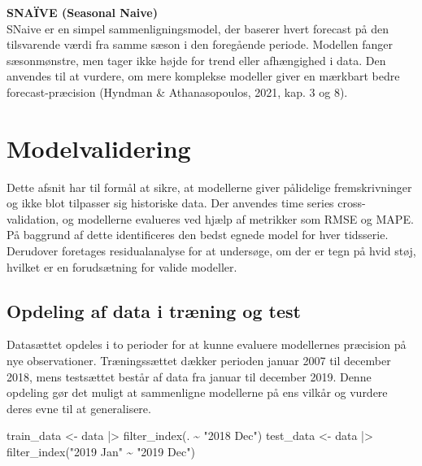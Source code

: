 \documentclass[
]{article}
\newenvironment{Shaded}{\begin{snugshade}}{\end{snugshade}}
\newcommand{\FunctionTok}[1]{\textcolor[rgb]{0.28,0.35,0.67}{#1}}
\newcommand{\NormalTok}[1]{\textcolor[rgb]{0.00,0.23,0.31}{#1}}
\newcommand{\OtherTok}[1]{\textcolor[rgb]{0.00,0.23,0.31}{#1}}
\newcommand{\SpecialCharTok}[1]{\textcolor[rgb]{0.37,0.37,0.37}{#1}}
\newcommand{\StringTok}[1]{\textcolor[rgb]{0.13,0.47,0.30}{#1}}
\begin{document}
\textbf{SNAÏVE (Seasonal Naive)}\\
SNaive er en simpel sammenligningsmodel, der baserer hvert forecast på
den tilsvarende værdi fra samme sæson i den foregående periode. Modellen
fanger sæsonmønstre, men tager ikke højde for trend eller afhængighed i
data. Den anvendes til at vurdere, om mere komplekse modeller giver en
mærkbart bedre forecast-præcision (Hyndman \& Athanasopoulos, 2021, kap.
3 og 8).

\section{Modelvalidering}\label{modelvalidering}

Dette afsnit har til formål at sikre, at modellerne giver pålidelige
fremskrivninger og ikke blot tilpasser sig historiske data. Der anvendes
time series cross-validation, og modellerne evalueres ved hjælp af
metrikker som RMSE og MAPE. På baggrund af dette identificeres den bedst
egnede model for hver tidsserie. Derudover foretages residualanalyse for
at undersøge, om der er tegn på hvid støj, hvilket er en forudsætning
for valide modeller.

\subsection{Opdeling af data i træning og
test}\label{opdeling-af-data-i-truxe6ning-og-test}

Datasættet opdeles i to perioder for at kunne evaluere modellernes
præcision på nye observationer. Træningssættet dækker perioden januar
2007 til december 2018, mens testsættet består af data fra januar til
december 2019. Denne opdeling gør det muligt at sammenligne modellerne
på ens vilkår og vurdere deres evne til at generalisere.

\begin{Shaded}
\begin{Highlighting}[]
\NormalTok{train\_data }\OtherTok{\textless{}{-}}\NormalTok{ data }\SpecialCharTok{|\textgreater{}} \FunctionTok{filter\_index}\NormalTok{(. }\SpecialCharTok{\textasciitilde{}} \StringTok{"2018 Dec"}\NormalTok{)}
\NormalTok{test\_data  }\OtherTok{\textless{}{-}}\NormalTok{ data }\SpecialCharTok{|\textgreater{}} \FunctionTok{filter\_index}\NormalTok{(}\StringTok{"2019 Jan"} \SpecialCharTok{\textasciitilde{}} \StringTok{"2019 Dec"}\NormalTok{)}
\end{Highlighting}
\end{Shaded}
\end{document}
